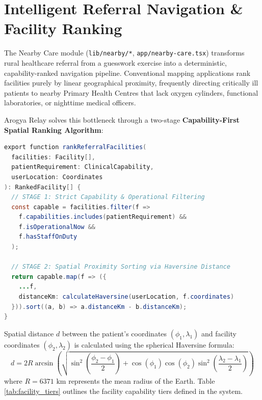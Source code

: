 \documentclass[12pt,a4paper,oneside]{report}
\begin{document}
\section{Intelligent Referral Navigation \& Facility Ranking}
The Nearby Care module (\texttt{lib/nearby/*}, \texttt{app/nearby-care.tsx}) transforms rural healthcare referral from a guesswork exercise into a deterministic, capability-ranked navigation pipeline. Conventional mapping applications rank facilities purely by linear geographical proximity, frequently directing critically ill patients to nearby Primary Health Centres that lack oxygen cylinders, functional laboratories, or nighttime medical officers.

Arogya Relay solves this bottleneck through a two-stage \textbf{Capability-First Spatial Ranking Algorithm}:

\begin{lstlisting}[language=Java, caption={Capability-First Spatial Referral Ranking Algorithm (TypeScript)}, label={lst:ts_referral}]
export function rankReferralFacilities(
  facilities: Facility[],
  patientRequirement: ClinicalCapability,
  userLocation: Coordinates
): RankedFacility[] {
  // STAGE 1: Strict Capability & Operational Filtering
  const capable = facilities.filter(f =>
    f.capabilities.includes(patientRequirement) &&
    f.isOperationalNow &&
    f.hasStaffOnDuty
  );
  
  // STAGE 2: Spatial Proximity Sorting via Haversine Distance
  return capable.map(f => ({
    ...f,
    distanceKm: calculateHaversine(userLocation, f.coordinates)
  })).sort((a, b) => a.distanceKm - b.distanceKm);
}
\end{lstlisting}

Spatial distance $d$ between the patient's coordinates $(\phi_1, \lambda_1)$ and facility coordinates $(\phi_2, \lambda_2)$ is calculated using the spherical Haversine formula:
\begin{equation}
    d = 2 R \arcsin \left( \sqrt{\sin^2\left(\frac{\phi_2 - \phi_1}{2}\right) + \cos(\phi_1)\cos(\phi_2)\sin^2\left(\frac{\lambda_2 - \lambda_1}{2}\right)} \right)
    \label{eq:haversine}
\end{equation}
where $R = 6371\text{ km}$ represents the mean radius of the Earth. Table \ref{tab:facility_tiers} outlines the facility capability tiers defined in the system.
\end{document}
